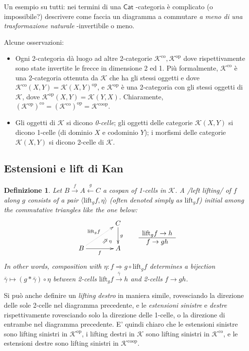 \documentclass[11pt]{article}
\def\Cat{\mathsf{Cat}}
\def\xto#1{\xrightarrow{#1}}
\def\xot#1{\xleftarrow{#1}}
\def\To{\Rightarrow}
\newcommand{\deduction}[4]{\begin{array}{c} #1 \to #2 \\ \hline #3 \to #4 \end{array}}
\newcommand{\Nearrow}{\rotatebox[origin=c]{45}{$\Rightarrow$}}  %
\def\opp{\mathrm{op}}
\def\co{\mathrm{co}}
\def\coop{\mathrm{coop}}
\def\leeft{\mathrm{lift}} %
\theoremstyle{reference}
\newtheorem{definition}[theorem]{Definizione}
\begin{document}
Un esempio su tutti: nei termini di una \(\Cat\) -categoria è
complicato (o impossibile?) descrivere come faccia un
diagramma a commutare \emph{a meno di una trasformazione
naturale} -invertibile o meno.

Alcune osservazioni:

\begin{itemize}
\item Ogni 2-categoria dà luogo ad altre 2-categorie \(\mathcal
  K^\co, \mathcal K^\opp\) dove rispettivamente sono state
invertite le frecce in dimensione 2 ed 1. Più formalmente,
\(\mathcal K^\co\) è una 2-categoria ottenuta da \(\mathcal
  K\) che ha gli stessi oggetti e dove \(\mathcal K^\co(X,Y) =
  \mathcal K(X,Y)^\opp\), e \(\mathcal K^\opp\) è una
2-categoria con gli stessi oggetti di \(\mathcal K\), dove
\(\mathcal K^\opp(X,Y) = \mathcal K(Y,X)\). Chiaramente,
\((\mathcal K^\opp)^\co = (\mathcal K^\co)^\opp = \mathcal
  K^\text{coop}\).
\item Gli oggetti di \(\mathcal K\) si dicono \emph{0-celle}; gli
oggetti delle categorie \({\mathcal K}(X,Y)\) si dicono
1-celle (di dominio \(X\) e codominio \(Y\)); i morfismi delle
categorie \({\mathcal K}(X,Y)\) si dicono 2-celle di
\(\mathcal K\).
\end{itemize}

\subsection{Estensioni e lift di Kan}
\label{sec:org15cd52d}

\begin{definition}
Let $B \xto{f} A \xot{g}C$ a cospan of
1-cells in ${\mathcal K}$. A /left lifting/ of $f$ along $g$
consists of a pair $\langle\leeft_gf,\eta\rangle$ (often
denoted simply as $\leeft_gf$) initial among the commutative
triangles like the one below: 
\[
\vcenter{\xymatrix@C=1.4cm{& C\ar[d]^g \\ B\ar[r]_f
\ar@{.>}[ur]^{\leeft_gf} & \ar@{}[ul]|(.3){\Nearrow\eta} A}}
\qquad \deduction{\leeft_gf}{h}{f}{gh} 
\] In other words,
composition with $\eta \colon f \To g \circ \leeft_gf$
determines a bijection $\bar\gamma \mapsto (g *
\bar\gamma)\circ \eta$ between 2-cells $\leeft_gf
\xto{\bar\gamma} h$ and 2-cells $f \to gh$.
\end{definition}

Si può anche definire un \emph{lifting destro} in maniera
simile, rovesciando la direzione delle sole 2-celle nel
diagramma precedente, e le \emph{estensioni sinistre} e
\emph{destre} rispettivamente rovesciando solo la direzione
delle 1-celle, o la direzione di entrambe nel diagramma
precedente. E' quindi chiaro che le estensioni sinistre sono
lifting sinistri in \({\mathcal K}^\opp\), i lifting destri in
\({\mathcal K}\) sono lifting sinistri in \({\mathcal K}^\co\),
e le estensioni destre sono lifting sinistri in \({\mathcal
K}^\coop\).
\end{document}
